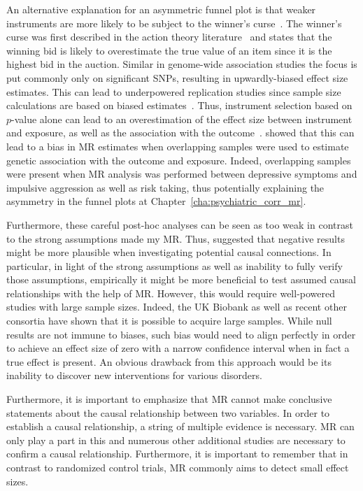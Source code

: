 An alternative explanation for an asymmetric funnel plot is that weaker instruments are more likely to be subject to the winner's curse~\cite{Taylor2014}.
The winner's curse was first described in the action theory literature~\cite{Bazerman1983} and states that the winning bid is likely to overestimate the true value of an item since it is the highest bid in the auction.
Similar in genome-wide association studies the focus is put commonly only  on significant SNPs, resulting in upwardly-biased effect size estimates.
This can lead to underpowered replication studies since sample size calculations are based on biased estimates~\cite{Xiao2008}.
Thus, instrument selection based on $p$-value alone can lead to an overestimation of the effect size between instrument and exposure, as well as  the association with the outcome~\cite{Bowden2015,Taylor2014}.
\citet{Burgess2016c} showed that this can lead to a bias in MR estimates when overlapping samples were used to estimate genetic association with the outcome and exposure.
Indeed, overlapping samples were present when MR analysis was performed between depressive symptoms and impulsive aggression as well as risk taking,
thus potentially explaining the asymmetry in the funnel plots at Chapter~\ref{cha:psychiatric_corr_mr}.

Furthermore, these careful post-hoc analyses can be seen as too weak in contrast to the strong assumptions made my MR\@. 
Thus, \citet{Vanderweele2015} suggested that negative results might be more plausible when investigating potential causal connections.
In particular, in light of the strong assumptions as well as inability to fully verify those assumptions, empirically it might be more beneficial to test assumed causal relationships with the help of MR\@.
However, this would require well-powered studies with large sample sizes.
Indeed, the UK Biobank as well as recent other consortia have shown that it is possible to acquire large samples.
While null results are not immune to biases, such bias would need to align perfectly in order to achieve an effect size of zero with a narrow confidence interval when in fact a true effect is present.
An obvious drawback from this approach would be its inability to discover new interventions for various disorders. 

Furthermore, it is important to emphasize that MR cannot make conclusive statements about the causal relationship between two variables.
In order to establish a causal relationship, a string of multiple evidence is necessary.
MR can only play a part in this and numerous other additional studies are necessary to confirm a causal relationship.
Furthermore, it is important to remember that in contrast to randomized control trials, MR commonly aims to detect small effect sizes.

